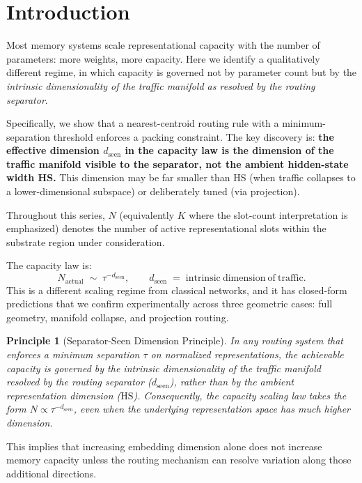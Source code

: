 \documentclass[11pt]{article}
\newtheorem{principle}[theorem]{Principle}
\begin{document}
\section{Introduction}

Most memory systems scale representational capacity with the number of
parameters: more weights, more capacity.
Here we identify a qualitatively different regime, in which capacity is
governed not by parameter count but by the \emph{intrinsic dimensionality of the
traffic manifold as resolved by the routing separator}.

Specifically, we show that a nearest-centroid routing rule with a
minimum-separation threshold enforces a packing constraint. The key discovery is:
\textbf{the effective dimension $d_{\text{seen}}$ in the capacity law is the dimension
of the traffic manifold visible to the separator, not the ambient hidden-state width HS.}
This dimension may be far smaller than HS (when traffic collapses to a lower-dimensional subspace)
or deliberately tuned (via projection).

Throughout this series, $N$ (equivalently $K$ where the slot-count interpretation is emphasized) denotes the number of active representational slots within the substrate region under consideration.

The capacity law is:
\[
  N_{\mathrm{actual}} \;\sim\; \tau^{-d_{\text{seen}}}, \qquad d_{\text{seen}} \;=\; \mathrm{intrinsic\ dimension\ of\ traffic}.
\]
This is a different scaling regime from classical networks, and it has
closed-form predictions that we confirm experimentally across three geometric cases:
full geometry, manifold collapse, and projection routing.

\begin{principle}[Separator-Seen Dimension Principle]
In any routing system that enforces a minimum separation $\tau$ on normalized representations, the achievable capacity is governed by the intrinsic dimensionality of the traffic manifold resolved by the routing separator ($d_{\text{seen}}$), rather than by the ambient representation dimension ($\mathrm{HS}$). Consequently, the capacity scaling law takes the form $N \propto \tau^{-d_{\text{seen}}}$, even when the underlying representation space has much higher dimension.
\end{principle}

This implies that increasing embedding dimension alone does not increase memory capacity unless the routing mechanism can resolve variation along those additional directions.
\end{document}
